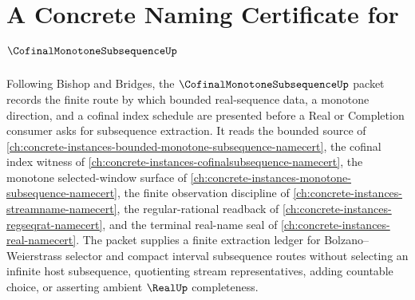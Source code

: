 \chapter{A Concrete Naming Certificate for $\CofinalMonotoneSubsequenceUp$}
\label{ch:concrete-instances-cofinal-monotone-subsequence-namecert}

Following Bishop and Bridges, the $\CofinalMonotoneSubsequenceUp$ packet records the finite route by which bounded real-sequence data, a monotone direction, and a cofinal index schedule are presented before a Real or Completion consumer asks for subsequence extraction. It reads the bounded source of \autoref{ch:concrete-instances-bounded-monotone-subsequence-namecert}, the cofinal index witness of \autoref{ch:concrete-instances-cofinalsubsequence-namecert}, the monotone selected-window surface of \autoref{ch:concrete-instances-monotone-subsequence-namecert}, the finite observation discipline of \autoref{ch:concrete-instances-streamname-namecert}, the regular-rational readback of \autoref{ch:concrete-instances-regseqrat-namecert}, and the terminal real-name seal of \autoref{ch:concrete-instances-real-namecert}. The packet supplies a finite extraction ledger for Bolzano--Weierstrass selector and compact interval subsequence routes without selecting an infinite host subsequence, quotienting stream representatives, adding countable choice, or asserting ambient $\RealUp$ completeness.

